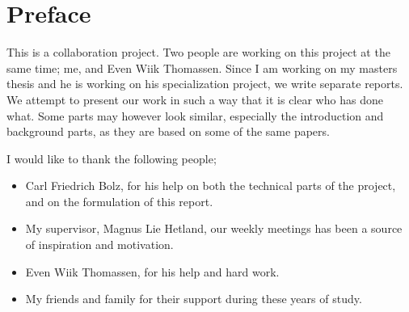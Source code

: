 
\chapter*{Preface}


This is a collaboration project. Two people are working on this
project at the same time; me, and Even Wiik Thomassen. Since I am working
on my masters thesis and he is working on his specialization project, we 
write separate reports. We attempt to present our work in such a way that
it is clear who has done what. Some parts may however look similar,
especially the introduction and background parts, as they are based on 
some of the same papers.


I would like to thank the following people;

\begin{itemize}

\item Carl Friedrich Bolz, for his help on both the technical parts
of the project, and on the formulation of this report.

\item My supervisor, Magnus Lie Hetland, our weekly meetings has been
a source of inspiration and motivation.

\item Even Wiik Thomassen, for his help and hard work.

\item My friends and family for their support during these years of study.

\end{itemize}
